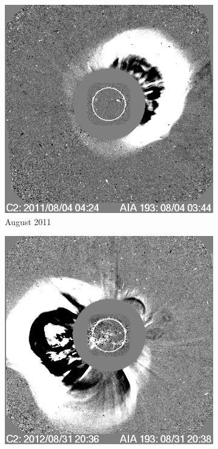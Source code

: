 \message{ !name(main.tex)}\documentclass[12pt]{article}
\begin{document}
\begin{figure}[h!]
    \begin{subfigure}[b]{0.3\textwidth}
        \centering
        \includegraphics[width=\textwidth]{images/soho_cme_aug_04_2011.png}
        \caption[August  2011 CME]{August  2011}
        \label{fig:soho_cme_aug_04_2011}
    \end{subfigure}
    \hfill
    \begin{subfigure}[b]{0.3\textwidth}
        \includegraphics[width=\textwidth]{images/soho_cme_aug_31_2012.png}

\end{subfigure}
\end{figure}
\end{document}
